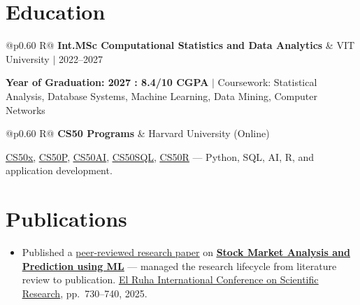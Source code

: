 \documentclass[a4paper,10pt]{article}
\newcommand{\ulink}[2]{\href{#1}{\uline{#2}}}
\newcommand{\subheading}[1]{{\color[HTML]{0A0A0A}\fontsize{12}{14}\selectfont\bfseries #1}}
\newcommand{\meta}[1]{{\color[HTML]{5C5C5C}\fontsize{10.5}{12.5}\selectfont #1}}
\begin{document}
\vspace{2pt}

\section{Education}
\vspace{2pt}

\begin{tabularx}{\linewidth}{@{}p{0.60\linewidth} R@{}}
\subheading{Int.MSc Computational Statistics and Data Analytics} & \meta{VIT University $|$ 2022--2027}
\end{tabularx}
\vspace{1pt}
{\color[HTML]{3A3A3A}\fontsize{11}{14}\selectfont \textbf{Year of Graduation: 2027 : 8.4/10 CGPA} $|$ Coursework: Statistical Analysis, Database Systems, Machine Learning, Data Mining, Computer Networks}

\begin{tabularx}{\linewidth}{@{}p{0.60\linewidth} R@{}}
\subheading{CS50 Programs} & \meta{Harvard University (Online)}
\end{tabularx}
\vspace{1pt}
{\color[HTML]{3A3A3A}\fontsize{11}{14}\selectfont \ulink{https://cs50.harvard.edu/certificates/b14b78df-e05c-413e-a607-1dd27303053a}{CS50x}, \ulink{https://cs50.harvard.edu/certificates/32477052-9db4-49c4-a5a4-d7e58429ca2c}{CS50P}, \ulink{https://cs50.harvard.edu/certificates/9cdb4d4a-1250-4f8e-9fd7-191864e0f919}{CS50AI}, \ulink{https://cs50.harvard.edu/certificates/bc486f24-f085-4e61-8536-80940b97a1b9}{CS50SQL}, \ulink{https://cs50.harvard.edu/certificates/666838e6-a053-4d82-b179-a60fe745fd84}{CS50R} --- Python, SQL, AI, R, and application development.}

\vspace{2pt}

\section{Publications}
\vspace{2pt}
\begin{itemize}[nosep, leftmargin=1.5em, itemsep=1pt, topsep=2pt]
  \item {\color[HTML]{0A0A0A}\fontsize{11}{14}\selectfont
  Published a \ulink{https://www.elruha.org/_files/ugd/614b1f_6b95e1b697bf452b9907ba46e0151c05.pdf\#page=774}{peer-reviewed research paper} on \ulink{https://github.com/su-jin1425/Set-Project}{\textbf{Stock Market Analysis and Prediction using ML}} --- managed the research lifecycle from literature review to publication. \ulink{https://www.elruha.org/congress-books}{El Ruha International Conference on Scientific Research}, pp.\ 730--740, 2025.}
\end{itemize}
\end{document}
